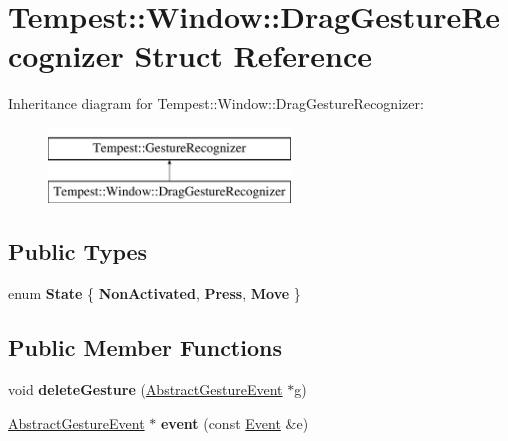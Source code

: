 \hypertarget{struct_window_1_1_drag_gesture_recognizer}{\section{Tempest\+:\+:Window\+:\+:Drag\+Gesture\+Recognizer Struct Reference}
\label{struct_window_1_1_drag_gesture_recognizer}
}
Inheritance diagram for Tempest\+:\+:Window\+:\+:Drag\+Gesture\+Recognizer\+:\begin{figure}[H]
\begin{center}
\leavevmode
\includegraphics[height=2.000000cm]{struct_window_1_1_drag_gesture_recognizer}
\end{center}
\end{figure}
\subsection*{Public Types}
\begin{DoxyCompactItemize}
\item 
\hypertarget{struct_window_1_1_drag_gesture_recognizer_af6ad3e83a79dea92e5a429b6ee64ae0a}{enum {\bfseries State} \{ {\bfseries Non\+Activated}, 
{\bfseries Press}, 
{\bfseries Move}
 \}}\label{struct_window_1_1_drag_gesture_recognizer_af6ad3e83a79dea92e5a429b6ee64ae0a}

\end{DoxyCompactItemize}
\subsection*{Public Member Functions}
\begin{DoxyCompactItemize}
\item 
\hypertarget{struct_window_1_1_drag_gesture_recognizer_a3463dc5ebbdda93c0d414d76b3e9fb97}{void {\bfseries delete\+Gesture} (\hyperlink{class_tempest_1_1_abstract_gesture_event}{Abstract\+Gesture\+Event} $\ast$g)}\label{struct_window_1_1_drag_gesture_recognizer_a3463dc5ebbdda93c0d414d76b3e9fb97}

\item 
\hypertarget{struct_window_1_1_drag_gesture_recognizer_aa2db7b37a81b7842f428e48bbaa20a3c}{\hyperlink{class_tempest_1_1_abstract_gesture_event}{Abstract\+Gesture\+Event} $\ast$ {\bfseries event} (const \hyperlink{class_tempest_1_1_event}{Event} \&e)}\label{struct_window_1_1_drag_gesture_recognizer_aa2db7b37a81b7842f428e48bbaa20a3c}

\end{DoxyCompactItemize}
